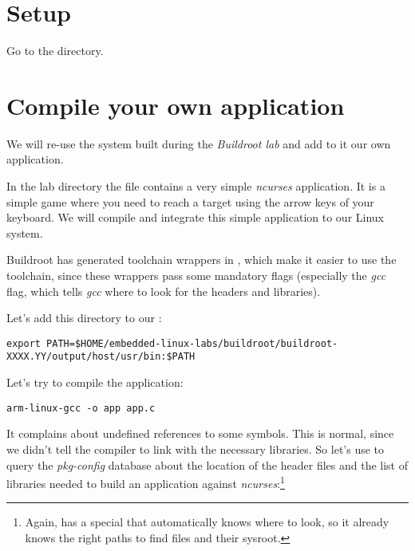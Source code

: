 
\section{Setup}

Go to the  directory.

\section{Compile your own application}

We will re-use the system built during the {\em Buildroot lab} and add
to it our own application.

In the lab directory the file  contains a very simple
{\em ncurses} application. It is a simple game where you need to reach
a target using the arrow keys of your keyboard.  We will compile and
integrate this simple application to our Linux system.

Buildroot has generated toolchain wrappers in
, which make it easier to use the toolchain,
since these wrappers pass some mandatory flags (especially the
 {\em gcc} flag, which tells {\em gcc} where to look
for the headers and libraries).

Let's add this directory to our :

\footnotesize
\begin{verbatim}
export PATH=$HOME/embedded-linux-labs/buildroot/buildroot-XXXX.YY/output/host/usr/bin:$PATH
\end{verbatim}
\normalsize

Let's try to compile the application:

\begin{verbatim}
arm-linux-gcc -o app app.c
\end{verbatim}

It complains about undefined references to some symbols. This is
normal, since we didn't tell the compiler to link with the necessary
libraries. So let's use  to query the {\em
pkg-config} database about the location of the header files and the
list of libraries needed to build an application against
{\em ncurses}:\footnote{Again,  has a special
 that automatically knows where to look, so it
already knows the right paths to find  files and their
sysroot.}

